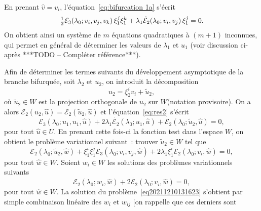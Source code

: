\documentclass{article}
\begin{document}
En prenant $\hat{v} = v_i$, l'{\'e}quation~\eqref{eq:bifurcation 1a}
s'{\'e}crit
\begin{equation}
  \label{eq:bifurcation 1b} \tfrac{1}{2} \mathcal{E}_3 (\lambda_0 ; v_i, v_j,
  v_k)  \hspace{0.17em} \xi_1^j \xi_1^k + \lambda_1  \dot{\mathcal{E}}_2
  (\lambda_0 ; v_i, v_j)  \hspace{0.17em} \xi_1^j = 0.
\end{equation}
On obtient ainsi un syst{\`e}me de $m$ {\'e}quations quadratiques {\`a} $(m +
1)$ inconnues, qui permet en g{\'e}n{\'e}ral de d{\'e}terminer les valeurs de
$\lambda_1$ et $u_1$ (voir discussion ci-apr{\`e}s ***TODO -- Compl{\'e}ter
r{\'e}f{\'e}rence***).

Afin de d{\'e}terminer les termes suivants du d{\'e}veloppement asymptotique
de la branche bifurqu{\'e}e, soit $\lambda_2$ et $u_2$, on introduit la
d{\'e}composition
\begin{equation}
  u_2 = \xi_2^i v_i + \tilde{u}_2,
\end{equation}
o{\`u} $\tilde{u}_2 \in W$ est la projection orthogonale de $u_2$ sur
$W$(notation provisoire). On a alors $\mathcal{E}_2 (u_2, \hat{u})
=\mathcal{E}_2 (\tilde{u}_2, \hat{u})$ et l'{\'e}quation~\eqref{eq:res2}
s'{\'e}crit
\begin{equation}
  \mathcal{E}_3 (\lambda_0 ; u_1, u_1, \hat{u}) + 2 \lambda_1
  \dot{\mathcal{E}_2} (\lambda_0 ; u_1, \hat{u}) +\mathcal{E}_2 (\lambda_0 ;
  \tilde{u}_2, \hat{u}) = 0,
\end{equation}
pour tout $\hat{u} \in U$. En prenant cette fois-ci la fonction test dans
l'espace $W$, on obtient le probl{\`e}me variationnel suivant~: trouver
$\tilde{u}_2 \in W$ tel que
\begin{equation}
  \label{eq20211210131623} \mathcal{E}_2 (\lambda_0 ; {\tilde{u}_2} , \hat{w})
  + \xi_1^i \xi_1^j \mathcal{E}_3 (\lambda_0 ; v_i, v_j, \hat{w}) + 2
  \lambda_1 \xi_1^i  \dot{\mathcal{E}_2} (\lambda_0 ; v_i, \hat{w}) = 0,
\end{equation}
pour tout $\hat{w} \in W$. Soient $w_i \in W$ les solutions des probl{\`e}mes
variationnels suivants
\begin{equation}
  \label{eq:pbvar wi} \mathcal{E}_2 (\lambda_0 ; w_i, \hat{w}) + 2
  \dot{\mathcal{E}_2} (\lambda_0 ; v_i, \hat{w}) = 0,
\end{equation}
pour tout $\hat{w} \in W$. La solution du
probl{\`e}me~\eqref{eq20211210131623} s'obtient par simple combinaison
lin{\'e}aire des $w_i$ et $w_{ij}$ [on rappelle que ces derniers sont
\end{document}
